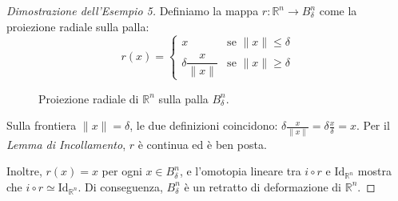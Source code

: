 \begin{proof}[Dimostrazione dell'Esempio 5]
Definiamo la mappa $r: \mathbb{R}^n \to B_\delta^n$ come la proiezione radiale sulla palla:
\[
r(x) = 
\begin{cases}
    x & \text{se } \|x\| \leqslant \delta \\
    \delta \dfrac{x}{\|x\|} & \text{se } \|x\| \geqslant \delta
\end{cases}
\]

\begin{figure}[H]
    \centering
    \caption{Proiezione radiale di $\mathbb{R}^n$ sulla palla $B_\delta^n$.}
\end{figure}

Sulla frontiera $\|x\| = \delta$, le due definizioni coincidono: $\delta \frac{x}{\|x\|} = \delta \frac{x}{\delta} = x$. Per il \textit{Lemma di Incollamento}, $r$ è continua ed è ben posta.

Inoltre, $r(x) = x$ per ogni $x \in B_\delta^n$, e l'omotopia lineare tra $i \circ r$ e $\mathrm{Id}_{\mathbb{R}^n}$ mostra che $i \circ r \simeq \mathrm{Id}_{\mathbb{R}^n}$. Di conseguenza, $B_\delta^n$ è un retratto di deformazione di $\mathbb{R}^n$.
\end{proof}

